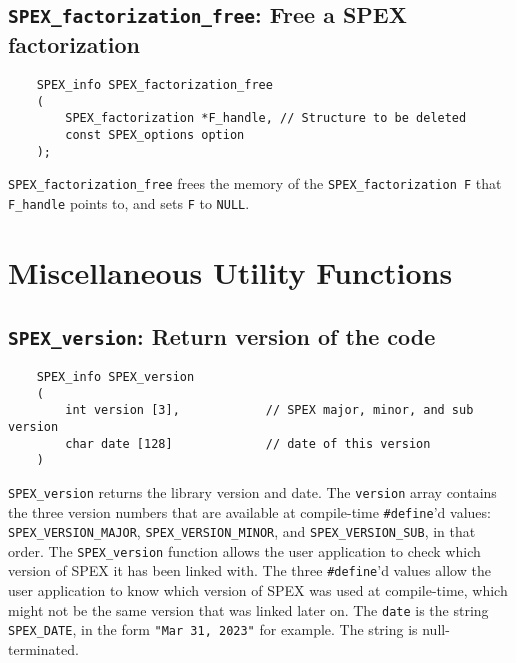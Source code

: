 \documentclass[12pt,oneside]{book}
\theoremstyle{definition}
\begin{document}
\subsection{\texttt{SPEX\_factorization\_free}: Free a SPEX factorization} \label{ss:spex_factorization_free}
\begin{mdframed}[userdefinedwidth=\textwidth]
{\footnotesize
\begin{verbatim}
    SPEX_info SPEX_factorization_free
    (
        SPEX_factorization *F_handle, // Structure to be deleted
        const SPEX_options option
    ); 
\end{verbatim}
} \end{mdframed}

\verb|SPEX_factorization_free| frees the memory of the \verb|SPEX_factorization F| that \verb|F_handle| points to, and sets \verb|F| to \verb|NULL|.

\newpage
\section{Miscellaneous Utility Functions}

\subsection{\texttt{SPEX\_version}: Return version of the code}
\label{spexver}
\begin{mdframed}[userdefinedwidth=\textwidth]
{\footnotesize
\begin{verbatim}
    SPEX_info SPEX_version
    (
        int version [3],            // SPEX major, minor, and sub version
        char date [128]             // date of this version
    )
\end{verbatim}
} \end{mdframed}

\verb|SPEX_version| returns the library version and date.
The \verb'version' array contains the three version
numbers that are available at compile-time \verb'#define''d values:
\verb'SPEX_VERSION_MAJOR',
\verb'SPEX_VERSION_MINOR', and
\verb'SPEX_VERSION_SUB', in that order.  The \verb'SPEX_version' function
allows the user application to check which version of SPEX it has been
linked with.  The three \verb'#define''d values allow the user application
to know which version of SPEX was used at compile-time, which might not
be the same version that was linked later on.
The \verb'date' is the string \verb'SPEX_DATE', in the form
\verb'"Mar 31, 2023"' for example.  The string is null-terminated.
\end{document}
